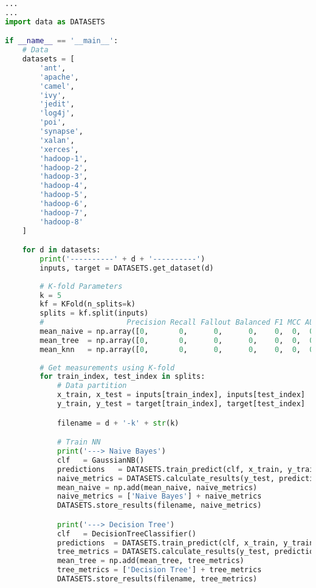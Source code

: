 \begin{lstlisting}[language=Python, caption={Calculate Metrics from Confusion 
Matrix to compare in-fold results}, label={lst:metrics-kfold}]
...
...
import data as DATASETS

if __name__ == '__main__':
    # Data
    datasets = [
        'ant',
        'apache',
        'camel',
        'ivy',
        'jedit',
        'log4j',
        'poi',
        'synapse',
        'xalan',
        'xerces',
        'hadoop-1',
        'hadoop-2',
        'hadoop-3',
        'hadoop-4',
        'hadoop-5',
        'hadoop-6',
        'hadoop-7',
        'hadoop-8'
    ]

    for d in datasets:
        print('----------' + d + '----------')
        inputs, target = DATASETS.get_dataset(d)
        
        # K-fold Parameters
        k = 5
        kf = KFold(n_splits=k)
        splits = kf.split(inputs)
        #                   Precision Recall Fallout Balanced F1 MCC AUC
        mean_naive = np.array([0,       0,      0,      0,    0,  0,  0])
        mean_tree  = np.array([0,       0,      0,      0,    0,  0,  0])
        mean_knn   = np.array([0,       0,      0,      0,    0,  0,  0])
        
        # Get measurements using K-fold
        for train_index, test_index in splits:
            # Data partition
            x_train, x_test = inputs[train_index], inputs[test_index]
            y_train, y_test = target[train_index], target[test_index]

            filename = d + '-k' + str(k)

            # Train NN
            print('---> Naive Bayes')
            clf   = GaussianNB() 
            predictions   = DATASETS.train_predict(clf, x_train, y_train, x_test)
            naive_metrics = DATASETS.calculate_results(y_test, predictions)
            mean_naive = np.add(mean_naive, naive_metrics)
            naive_metrics = ['Naive Bayes'] + naive_metrics
            DATASETS.store_results(filename, naive_metrics)

            print('---> Decision Tree')
            clf   = DecisionTreeClassifier()
            predictions  = DATASETS.train_predict(clf, x_train, y_train, x_test)
            tree_metrics = DATASETS.calculate_results(y_test, predictions)
            mean_tree = np.add(mean_tree, tree_metrics)
            tree_metrics = ['Decision Tree'] + tree_metrics
            DATASETS.store_results(filename, tree_metrics)
            

\end{lstlisting}
